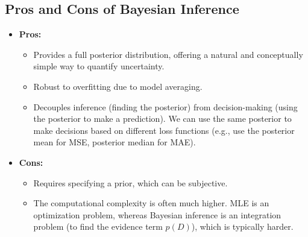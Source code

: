\documentclass{article}
\begin{document}
\begin{multicols}{2}
	\subsection{Pros and Cons of Bayesian Inference}
	\begin{itemize}
		\item \textbf{Pros:}
		      \begin{itemize}
			      \item Provides a full posterior distribution, offering a natural and conceptually simple way to quantify uncertainty.
			      \item Robust to overfitting due to model averaging.
			      \item Decouples inference (finding the posterior) from decision-making (using the posterior to make a prediction). We can use the same posterior to make decisions based on different loss functions (e.g., use the posterior mean for MSE, posterior median for MAE).
		      \end{itemize}
		\item \textbf{Cons:}
		      \begin{itemize}
			      \item Requires specifying a prior, which can be subjective.
			      \item The computational complexity is often much higher. MLE is an optimization problem, whereas Bayesian inference is an integration problem (to find the evidence term $p(D)$), which is typically harder.
		      \end{itemize}
	\end{itemize}


\end{multicols}
\end{document}
